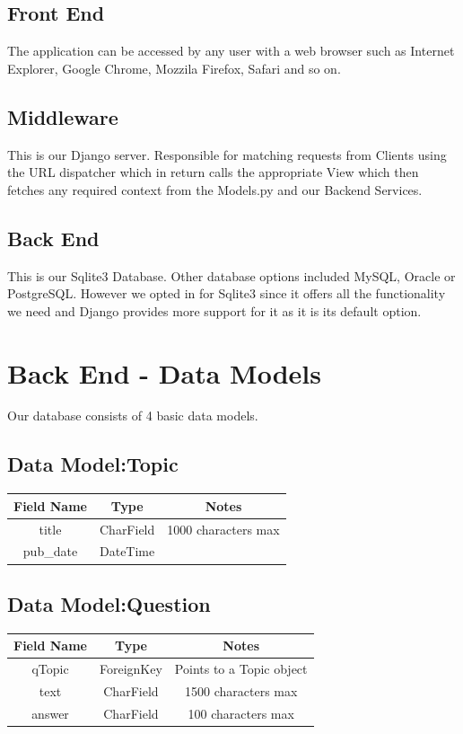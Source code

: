 \documentclass{l3proj}
\begin{document}
{\subsection{Front End}
The application can be accessed by any user with a web browser such as Internet 
Explorer, Google Chrome, Mozzila Firefox, Safari and so on. \\
\subsection{Middleware}
This is our Django server. Responsible for matching requests from Clients using the 
URL dispatcher which in return calls the appropriate View which then fetches any 
required context from the Models.py and our Backend Services. 
\subsection{Back End}
This is our Sqlite3 Database. Other database options included MySQL, Oracle or 
PostgreSQL. However we opted in for Sqlite3 since it offers all the functionality we 
need and Django provides more support for it as it is its default option. \\
\section{Back End - Data Models}
Our database consists of 4 basic data models. 
\subsection{Data Model:Topic}
\begin{tabular}{|c|c|c|}
\hline \textbf{Field Name} & \textbf{Type} & \textbf{Notes}\\
\hline title & CharField & 1000 characters max \\ 
\hline pub\_date & DateTime &  \\ \hline
\end{tabular}
\subsection{Data Model:Question}
\begin{tabular}{|c|c|c|}
\hline \textbf{Field Name} & \textbf{Type} & \textbf{Notes}\\
\hline qTopic & ForeignKey & Points to a Topic object \\ 
\hline text & CharField & 1500 characters max \\
\hline answer & CharField & 100 characters max \\ \hline
\end{tabular}

}
\end{document}
